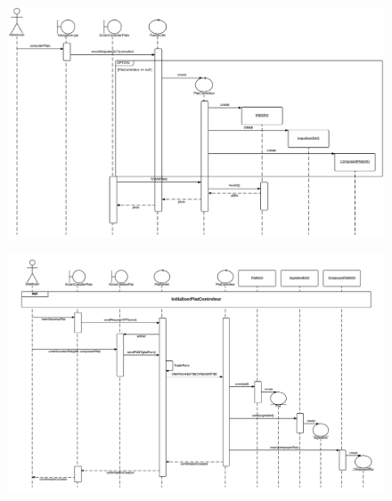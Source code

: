 \documentclass{beamer}
\begin{document}
\begin{frame}[plain]{}
\begin{figure}
\centering
\includegraphics[scale=0.11]{../CasDUtilisations/CompositionPlat/sequence_InitialisationPlatControleur.png}
\end{figure}
\end{frame}

\begin{frame}[plain]{}
\begin{figure}
\centering
\includegraphics[scale=0.325]{../CasDUtilisations/CompositionPlat/sequence_CreerPlat.png}
\end{figure}
\end{frame}
\end{document}
